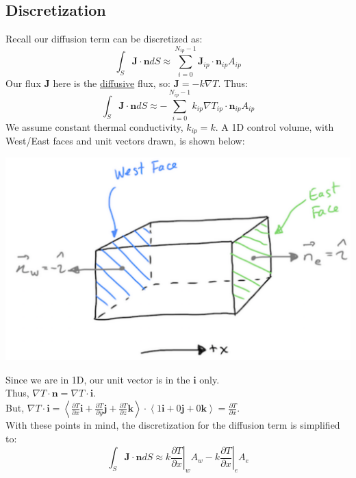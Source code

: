 \documentclass[14pt]{article}
\begin{document}
\subsection{Discretization}
\label{sec:orgb2f160a}
Recall our diffusion term can be discretized as:
\begin{equation}
\int_S \textbf{J} \cdot \textbf{n} dS \approx \sum_{i=0}^{N_{ip}-1} \textbf{J}_{ip}\cdot \textbf{n}_{ip}A_{ip}
\end{equation}
Our flux \(\textbf{J}\) here is the \uline{diffusive} flux, so: \(\textbf{J} = -k \nabla T\). Thus:
\begin{equation}
\int_S \textbf{J} \cdot \textbf{n} dS \approx -\sum_{i=0}^{N_{ip}-1} k_{ip} \nabla T_{ip}  \cdot \textbf{n}_{ip}A_{ip}
\end{equation}
We assume constant thermal conductivity, \(k_{ip} = k\). A 1D control volume, with West/East faces and unit vectors drawn, is shown below:
\begin{center}
\includegraphics[scale=0.2]{pic/heat1D_CV.png}
\end{center}
Since we are in 1D, our unit vector is in the \(\textbf{i}\) only.\\
Thus, \(\nabla T \cdot \textbf{n} = \nabla T \cdot \textbf{i}\).\\
But, \(\nabla T \cdot \textbf{i} = \left < \frac{\partial T}{\partial x} \textbf{i} + \frac{\partial T}{\partial y} \textbf{j} + \frac{\partial T}{\partial z} \textbf{k}
  \right > \cdot \left <1 \textbf{i} + 0 \textbf{j} + 0 \textbf{k}    \right> = \frac{\partial T}{\partial x}\). \\
With these points in mind, the discretization for the diffusion term is simplified to:
\begin{equation}
\int_S \textbf{J} \cdot \textbf{n} dS \approx k \left .\frac{\partial T}{\partial x}\right|_w A_w
- k \left .\frac{\partial T}{\partial x}\right|_e A_e 
\end{equation}
\end{document}
